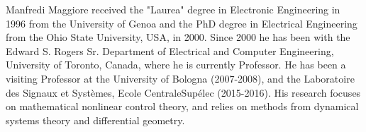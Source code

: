 Manfredi Maggiore received the "Laurea" degree in Electronic
Engineering in 1996 from the University of Genoa and the PhD degree in
Electrical Engineering from the Ohio State University, USA, in
2000. Since 2000 he has been with the Edward S. Rogers Sr. Department
of Electrical and Computer Engineering, University of Toronto, Canada,
where he is currently Professor. He has been a visiting Professor at
the University of Bologna (2007-2008), and the Laboratoire des Signaux
et Syst\`emes, Ecole CentraleSup\'elec (2015-2016). His research
focuses on mathematical nonlinear control theory, and relies on
methods from dynamical systems theory and differential geometry.

